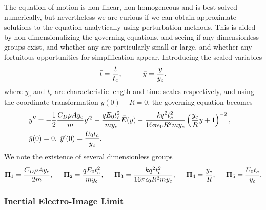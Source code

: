\documentclass[a4paper, 12pt]{article}
\begin{document}
The equation of motion is non-linear, non-homogeneous and is best solved numerically, but nevertheless we are curious if we can obtain approximate solutions to the equation analytically using perturbation methods. This is aided by non-dimensionalizing the governing equations, and seeing if any dimensionless groups exist, and whether any are particularly small or large, and whether any fortuitous opportunities for simplification appear. Introducing the scaled variables
\begin{equation}
 \bar{t} = \frac{t}{t_c}, \hspace{10 mm} \bar{y} = \frac{y}{y_c}, \end{equation}
where $y_c$ and $t_c$ are characteristic length and time scales respectively, and using the coordinate transformation $y(0) - R = 0$, the governing equation becomes
\begin{eqnarray}
& \bar{y}'' = - \frac{1}{2} \frac{C_D \rho A y_c}{m} \bar{y}'^2
- \frac{q E_0 t_c^2}{m y_c} \bar{E} ( \bar{y} ) 
- \frac{k q^2 t_c^2}{16 \pi \epsilon_0 R^2 m y_c} \left( \frac{y_c}{R} \bar{y} + 1 \right)^{-2}, & \nonumber \\
& \bar{y}(0) = 0, \hspace{1 mm} \bar{y}'(0) = \frac{U_0 t_c}{y_c} .& \label{scaled_eqn}
\end{eqnarray}
We note the existence of several dimensionless groups
\[ \mathbf{\Pi}_1 = \frac{C_D \rho A y_c}{2 m}, \hspace{5 mm}
\mathbf{\Pi}_2 = \frac{q E_0 t_c^2}{m y_c}, \hspace{5 mm}
\mathbf{\Pi}_3 = \frac{k q^2 t_c^2}{16 \pi \epsilon_0 R^2 m y_c}, \hspace{5 mm}
\mathbf{\Pi}_4 = \frac{y_c}{R}, \hspace{5 mm}
\mathbf{\Pi}_5 = \frac{U_0 t_c}{y_c}.\]

\subsubsection{Inertial Electro-Image Limit}
\end{document}
